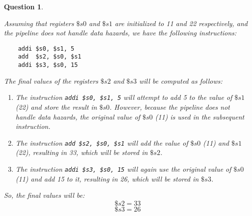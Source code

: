 \documentclass{article}
\theoremstyle{questionstyle}
\newtheorem{q}{Question}
\begin{document}
\newpage
\begin{q}\begin{enumerate} \leavevmode
    Assuming that registers $\$s0$ and $\$s1$ are initialized to 11 and 22 respectively, and the pipeline does not handle data hazards, we have the following instructions:

\begin{verbatim}
    addi $s0, $s1, 5
    add  $s2, $s0, $s1
    addi $s3, $s0, 15
\end{verbatim}

The final values of the registers $\$s2$ and $\$s3$ will be computed as follows:

\begin{enumerate}
    \item The instruction \texttt{addi \$s0, \$s1, 5} will attempt to add 5 to the value of $\$s1$ (22) and store the result in $\$s0$. However, because the pipeline does not handle data hazards, the original value of $\$s0$ (11) is used in the subsequent instruction.
    \item The instruction \texttt{add \$s2, \$s0, \$s1} will add the value of $\$s0$ (11) and $\$s1$ (22), resulting in 33, which will be stored in $\$s2$.
    \item The instruction \texttt{addi \$s3, \$s0, 15} will again use the original value of $\$s0$ (11) and add 15 to it, resulting in 26, which will be stored in $\$s3$.
\end{enumerate}

So, the final values will be:
\[\$s2 = 33\]
\[\$s3 = 26\]
\end{enumerate}\end{q}
\end{document}
